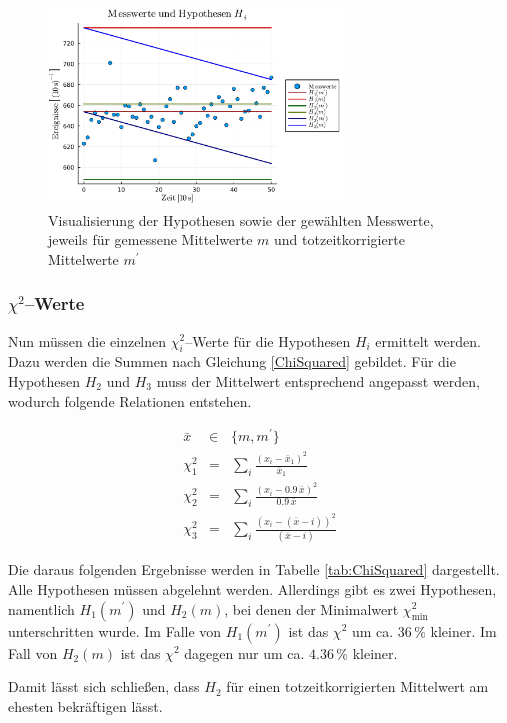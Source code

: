 \documentclass[12pt,a4paper]{scrartcl}
\numberwithin{equation}{section} %
\renewcommand{\[}{} %
\renewcommand{\]}{\noindent} %
\begin{document}
\begin{figure}[h]
	\centering
	\includegraphics[width=0.7\textwidth]{../media/B3.1/Hypothesen_plot.pdf}
	\caption{Visualisierung der Hypothesen sowie der gewählten Messwerte,\\
		jeweils für gemessene Mittelwerte $m$ und totzeitkorrigierte Mittelwerte $m^\prime$}
	\label{abb:Hypothesen}
\end{figure}

\newpage
\subsubsection{$\chi^2$--Werte}
Nun müssen die einzelnen $\chi^2_i$--Werte für die Hypothesen $H_i$ ermittelt werden. Dazu werden die Summen nach Gleichung \eqref{ChiSquared} gebildet. Für die Hypothesen $H_2$ und $H_3$ muss der Mittelwert entsprechend angepasst werden, wodurch folgende Relationen entstehen.

\begin{eqnarray}
	\bar x &\in& \{m, m^\prime\} \\
	\chi^2_1 &=& \sum_i \frac{(x_i-\bar x_1)^2}{\bar x_1} \\
	\chi^2_2 &=& \sum_i \frac{(x_i-0.9\,\bar x)^2}{0.9\,\bar x} \\
	\chi^2_3 &=& \sum_i \frac{(x_i-(\bar{x} - i))^2}{(\bar{x} - i)}
\end{eqnarray}

\noindent
Die daraus folgenden Ergebnisse werden in Tabelle \ref{tab:ChiSquared} dargestellt. Alle Hypothesen müssen abgelehnt werden. Allerdings gibt es zwei Hypothesen, namentlich $H_1(m^\prime)$ und $H_2(m)$, bei denen der Minimalwert $\chi^2_\mathrm{min}$ unterschritten wurde. Im Falle von $H_1(m^\prime)$ ist das $\chi^2$ um ca. $36\,\%$ kleiner. Im Fall von $H_2(m)$ ist das $\chi^2$ dagegen nur um ca. $4.36\,\%$ kleiner.

Damit lässt sich schließen, dass $H_2$ für einen totzeitkorrigierten Mittelwert am ehesten bekräftigen lässt.
\end{document}
